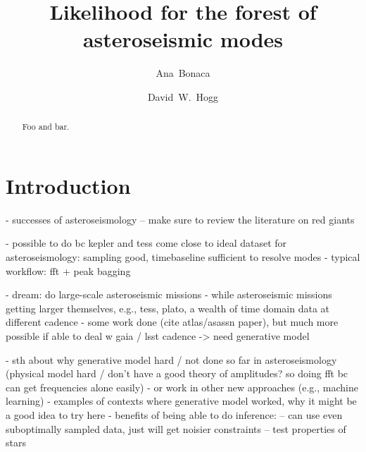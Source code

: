 \documentclass[modern]{aastex63}
\begin{document}
\sloppy\sloppypar\raggedbottom\frenchspacing %

\title{Likelihood for the forest of asteroseismic modes}


\author[0000-0002-7846-9787]{Ana~Bonaca}

\author[0000-0003-2866-9403]{David~W.~Hogg}

\begin{abstract}\noindent %
Foo and bar.
\end{abstract}

\section{Introduction}
\label{sec:intro}

- successes of asteroseismology
-- make sure to review the literature on red giants

- possible to do bc kepler and tess come close to ideal dataset for asteroseismology: sampling good, timebaseline sufficient to resolve modes
- typical workflow: fft + peak bagging

- dream: do large-scale asteroseismic missions
- while asteroseismic missions getting larger themselves, e.g., tess, plato, a wealth of time domain data at different cadence
- some work done (cite atlas/asassn paper), but much more possible if able to deal w gaia / lsst cadence
-> need generative model

- sth about why generative model hard / not done so far in asteroseismology (physical model hard / don't have a good theory of amplitudes? so doing fft bc can get frequencies alone easily)
- or work in other new approaches (e.g., machine learning)
- examples of contexts where generative model worked, why it might be a good idea to try here
- benefits of being able to do inference:
-- can use even suboptimally sampled data, just will get noisier constraints
-- test properties of stars
\end{document}
